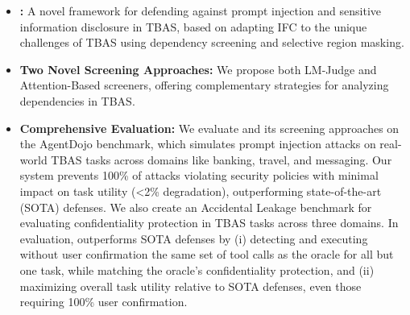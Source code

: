 \begin{itemize}
    \item \textbf{\sysname:} A novel framework for defending against prompt injection and sensitive information disclosure in TBAS, based on adapting IFC to the unique challenges of TBAS using dependency screening and selective region masking.
    \item \textbf{Two Novel Screening Approaches:} We propose both LM-Judge and Attention-Based screeners, offering complementary strategies for analyzing dependencies in TBAS.
    \item \textbf{Comprehensive Evaluation:} We evaluate \sysname and its screening approaches on the AgentDojo benchmark\cite{debenedetti2024agentdojo}, which simulates prompt injection attacks on real-world TBAS tasks across domains like banking, travel, and messaging. Our system prevents 100\% of attacks violating security policies with minimal impact on task utility (<2\% degradation), outperforming state-of-the-art (SOTA) defenses. We also create an Accidental Leakage benchmark for evaluating confidentiality protection in TBAS tasks across three domains. 
    In evaluation, \sysname outperforms SOTA defenses by (i) detecting and executing without user confirmation the same set of tool calls as the oracle for all but one task, while matching the oracle's confidentiality protection, and (ii) maximizing overall task utility relative to SOTA defenses, even those requiring 100\% user confirmation.
\end{itemize}
































